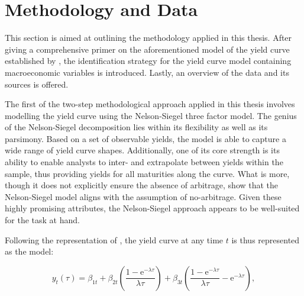 \section{Methodology and Data}
\label{sec:method}

This section is aimed at outlining the methodology applied in this thesis. After giving a comprehensive primer on the aforementioned model of the yield curve established by \citet{nelson1987parsimonious}, the identification strategy for the yield curve model containing macroeconomic variables is introduced. Lastly, an overview of the data and its sources is offered. 

The first of the two-step methodological approach applied in this thesis involves modelling the yield curve using the Nelson-Siegel three factor model. 
The genius of the Nelson-Siegel decomposition lies within its flexibility as well as its parsimony. 
Based on a set of observable yields, the model is able to capture a wide range of yield curve shapes. 
Additionally, one of its core strength is its ability to enable analysts to inter- and extrapolate between yields within the sample, thus providing yields for all maturities along the curve.
What is more, though it does not explicitly ensure the absence of arbitrage, \citet{coroneo2011arbitrage} show that the Nelson-Siegel model aligns with the assumption of no-arbitrage. 
Given these highly promising attributes, the Nelson-Siegel approach appears to be well-suited for the task at hand.

Following the representation of \citet{diebold2006macroeconomy}, the yield curve at any time $t$ is thus represented as the \citet{nelson1987parsimonious} model:

\begin{equation}
\label{eq:NS_basic}
    y_{t}(\tau)=\beta_{1t}+\beta_{2t}\left(\frac{1-\mathrm{e}^{-\lambda \tau}}{\lambda \tau}\right)+\beta_{3t}\left(\frac{1-\mathrm{e}^{-\lambda \tau}}{\lambda \tau}-\mathrm{e}^{-\lambda \tau}\right),
\end{equation}

